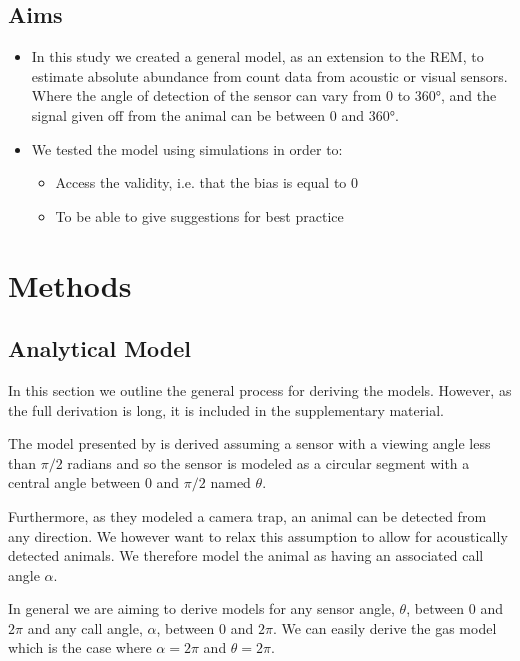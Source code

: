 \documentclass[a4paper,10pt,reqno,oneside]{amsart}
\begin{document}
\subsection{Aims}

\begin{itemize}
\item  In this study we created a general model, as an extension to the REM, to estimate absolute abundance from count data from acoustic or visual sensors. Where the angle of detection of the sensor can vary from 0 to 360°, and the signal given off from the animal can be between 0 and 360°.
\item  We tested the model using simulations in order to:
\begin{itemize}
\item Access the validity, i.e. that the bias is equal to 0
\item  To be able to give suggestions for best practice
\end{itemize}
\end{itemize}


\section{Methods}

\subsection{Analytical Model}

In this section we outline the general process for deriving the models. However, as the full derivation is long, it is included in the supplementary material.

The model presented by \citep{rowcliffe2008estimating} is derived assuming a sensor with a viewing angle less than $\pi/2$ radians and so the sensor is modeled as a circular segment with a central angle between 0 and  $\pi/2$ named  $\theta$.

Furthermore, as they modeled a camera trap, an animal can be detected from any direction. We however want to relax this assumption to allow for acoustically detected animals. We therefore model the animal as having an associated call angle $\alpha$.

In general we are aiming to derive models for any sensor angle, $ \theta$, between 0 and $2\pi$ and any call angle, $ \alpha$, between 0 and $2\pi$. We can easily derive the gas model which is the case where $ \alpha =  2\pi$ and $ \theta =  2\pi$.
\end{document}

